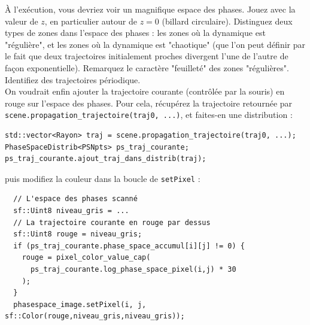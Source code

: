 \documentclass{book}
\newcommand{\inline}[1]{\texttt{#1}}
\begin{document}
À l'exécution, vous devriez voir un magnifique espace des phases. Jouez avec la valeur de $z$, en particulier autour de $z=0$ (billard circulaire). Distinguez deux types de zones dans l'espace des phases : les zones où la dynamique est "régulière", et les zones où la dynamique est "chaotique" (que l'on peut définir par le fait que deux trajectoires initialement proches divergent l'une de l'autre de façon exponentielle). Remarquez le caractère "feuilleté" des zones "régulières". Identifiez des trajectoires périodique.\\

On voudrait enfin ajouter la trajectoire courante (contrôlée par la souris) en rouge sur l'espace des phases. Pour cela, récupérez la trajectoire retournée par \inline{scene.propagation_trajectoire(traj0, ...)}, et faites-en une distribution :
\begin{verbatim}
std::vector<Rayon> traj = scene.propagation_trajectoire(traj0, ...);
PhaseSpaceDistrib<PSNpts> ps_traj_courante;
ps_traj_courante.ajout_traj_dans_distrib(traj);
\end{verbatim}
puis modifiez la couleur dans la boucle de \inline{setPixel} :
\begin{verbatim}
  // L'espace des phases scanné
  sf::Uint8 niveau_gris = ...
  // La trajectoire courante en rouge par dessus
  sf::Uint8 rouge = niveau_gris;
  if (ps_traj_courante.phase_space_accumul[i][j] != 0) {
    rouge = pixel_color_value_cap(
      ps_traj_courante.log_phase_space_pixel(i,j) * 30
    );
  }
  phasespace_image.setPixel(i, j, sf::Color(rouge,niveau_gris,niveau_gris));
\end{verbatim}
\end{document}
